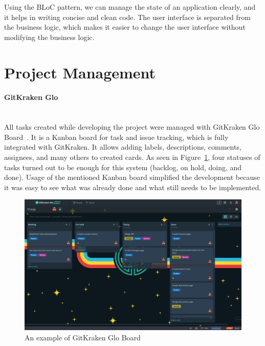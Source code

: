 Using the BLoC pattern, we can manage the state of an application clearly, and it helps in writing concise and clean code. The user interface is separated from the business logic, which makes it easier to change the user interface without modifying the business logic.


\section{Project Management}
\paragraph{\large{GitKraken Glo}}\mbox{}\\[2pt]
All tasks created while developing the project were managed with GitKraken Glo Board~\cite{gitkraken-glo}. It is a Kanban board for task and issue tracking, which is fully integrated with GitKraken. It allows adding labels, descriptions, comments, assignees, and many others to created cards. As seen in Figure~\ref{fig:glo-board}, four statuses of tasks turned out to be enough for this system (backlog, on hold, doing, and done). Usage of the mentioned Kanban board simplified the development because it was easy to see what was already done and what still needs to be implemented.

\begin{figure}[htb]
    \centering
    \includegraphics[width=.98\textwidth]{fig04/glo_board.png}
    \caption{An example of GitKraken Glo Board} \label{fig:glo-board}
\end{figure}

